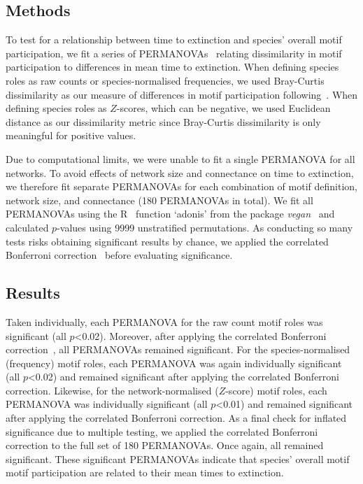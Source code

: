 \documentclass[12pt]{article}
\begin{document}
\begin{spacing}{2.0}
	\subsection*{Methods}


		To test for a relationship between time to extinction and species' overall motif participation, we fit a series of PERMANOVAs~\citep{Anderson2001} relating dissimilarity in motif participation to differences in mean time to extinction.
		When defining species roles as raw counts or species-normalised frequencies, we used Bray-Curtis dissimilarity as our measure of differences in motif participation following~\citet{Baker2015,Cirtwill2015}.
		When defining species roles as $Z$-scores, which can be negative, we used Euclidean distance as our dissimilarity metric since Bray-Curtis dissimilarity is only meaningful for positive values.


		Due to computational limits, we were unable to fit a single PERMANOVA for all networks.
		To avoid effects of network size and connectance on time to extinction, we therefore fit separate PERMANOVAs for each combination of motif definition, network size, and connectance (180 PERMANOVAs in total).
		We fit all PERMANOVAs using the R~\citep{R} function `adonis' from the package \emph{vegan}~\citep{vegan} and calculated $p$-values using 9999 unstratified permutations.
		As conducting so many tests risks obtaining significant results by chance, we applied the correlated Bonferroni correction~\citep{Drezner2016} before evaluating significance.

	\subsection*{Results}


		Taken individually, each PERMANOVA for the raw count motif roles was significant (all $p$\textless0.02). Moreover, after applying the correlated Bonferroni correction~\citep{Drezner2016}, all PERMANOVAs remained significant.
		For the species-normalised (frequency) motif roles, each PERMANOVA was again individually significant (all $p$\textless0.02) and remained significant after applying the correlated Bonferroni correction.
		Likewise, for the network-normalised ($Z$-score) motif roles, each PERMANOVA was individually significant (all $p$\textless0.01) and remained significant after applying the correlated Bonferroni correction.
		As a final check for inflated significance due to multiple testing, we applied the correlated Bonferroni correction to the full set of 180 PERMANOVAs.
		Once again, all remained significant.
		These significant PERMANOVAs indicate that species' overall motif motif participation are related to their mean times to extinction.


\end{spacing}
\end{document}
